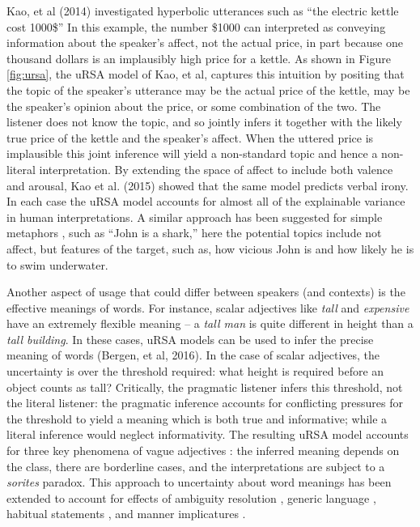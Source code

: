 \documentclass[]{elsarticle}
\begin{document}
Kao, et al (2014) investigated hyperbolic utterances such as ``the
electric kettle cost 1000\$'' In this example, the number \$1000 can
interpreted as conveying information about the speaker's affect, not the
actual price, in part because one thousand dollars is an implausibly
high price for a kettle. As shown in Figure \ref{fig:ursa}, the uRSA model of Kao, et
al, captures this intuition by positing that the topic of the speaker's
utterance may be the actual price of the kettle, may be the speaker's
opinion about the price, or some combination of the two. The listener
does not know the topic, and so jointly infers it together with the
likely true price of the kettle and the speaker's affect. When the
uttered price is implausible this joint inference will yield a
non-standard topic and hence a non-literal interpretation. By extending
the space of affect to include both valence and arousal, Kao et al.
(2015) showed that the same model predicts verbal irony. In each case
the uRSA model accounts for almost all of the explainable variance in
human interpretations. A similar approach has been suggested for simple
metaphors \cite{kao2015}, such as ``John is a shark,''
here the potential topics include not affect, but features of the
target, such as, how vicious John is and how likely he is to swim
underwater.

Another aspect of usage that could differ between speakers (and
contexts) is the effective meanings of words. For instance, scalar
adjectives like \emph{tall} and \emph{expensive} have an extremely
flexible meaning -- a \emph{tall man} is quite different in height than
a \emph{tall building}. In these cases, uRSA models can be used to infer
the precise meaning of words (Bergen, et al, 2016). In the case of
scalar adjectives, the uncertainty is over the threshold required: what
height is required before an object counts as tall? Critically, the
pragmatic listener infers this threshold, not the literal listener: the
pragmatic inference accounts for conflicting pressures for the threshold
to yield a meaning which is both true and informative; while a literal
inference would neglect informativity. The resulting uRSA model accounts
for three key phenomena of vague adjectives \citep{lassiter2015}: the inferred meaning depends on the class, there are borderline
cases, and the interpretations are subject to a \emph{sorites} paradox.
This approach to uncertainty about word meanings has been extended to
account for effects of ambiguity resolution \citep{scontrasunderrev}, generic language \citep{tesslerunderrev}, habitual
statements \citep{tessler2016}, and manner implicatures \citep{bergen2016}.
\end{document}
